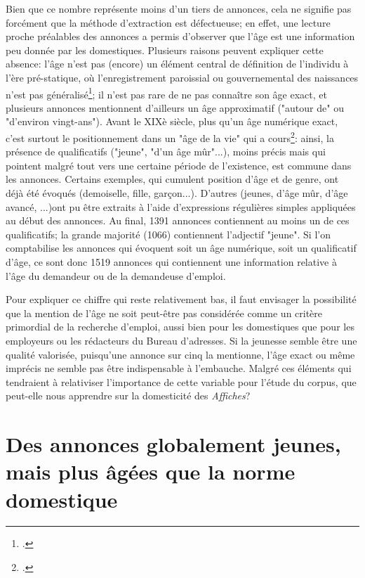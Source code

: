 Bien que ce nombre représente moins d'un tiers de annonces, cela ne signifie pas forcément que la méthode d'extraction est défectueuse; en effet, une lecture proche préalables des annonces a permis d'observer que l'âge est une information peu donnée par les domestiques. Plusieurs raisons peuvent expliquer cette absence: l'âge n'est pas (encore) un élément central de définition de l'individu à l'ère pré-statique, où l'enregistrement paroissial ou gouvernemental des naissances n'est pas généralisé\footcites{rennesAge2016}; il n'est pas rare de ne pas connaître son âge exact, et plusieurs annonces mentionnent d'ailleurs un âge approximatif ("autour de" ou "d'environ vingt-ans"). Avant le XIXè siècle, plus qu'un âge numérique exact, c'est surtout le positionnement dans un "âge de la vie" qui a cours\footcites{schmittInventionAnniversaire2007}: ainsi, la présence de qualificatifs ("jeune", "d'un âge mûr"...), moins précis mais qui pointent malgré tout vers une certaine période de l'existence, est commune dans les annonces. Certains exemples, qui cumulent position d'âge et de genre, ont déjà été évoqués (demoiselle, fille, garçon...). D'autres (jeunes, d'âge mûr, d'âge avancé, ...)ont pu être extraits à l'aide d'expressions régulières simples appliquées au début des annonces. Au final, 1391 annonces contiennent au moins un de ces qualificatifs;  la grande majorité (1066) contiennent l'adjectif "jeune". 
Si l'on comptabilise les annonces qui évoquent soit un âge numérique, soit un qualificatif d'âge, ce sont donc 1519 annonces qui contiennent une information relative à l'âge du demandeur ou de la demandeuse d'emploi.

Pour expliquer ce chiffre qui reste relativement bas, il faut envisager la possibilité que la mention de l'âge ne soit peut-être pas considérée comme un critère primordial de la recherche d'emploi, aussi bien pour les domestiques que pour les employeurs ou les rédacteurs du Bureau d'adresses. Si la jeunesse semble être une qualité valorisée, puisqu'une annonce sur cinq la mentionne, l'âge exact ou même imprécis ne semble pas être indispensable à l'embauche. Malgré ces éléments qui tendraient à relativiser l'importance de cette variable pour l'étude du corpus, que peut-elle nous apprendre sur la domesticité des \textit{Affiches}?


\section{Des annonces globalement jeunes, mais plus âgées que la norme domestique}

